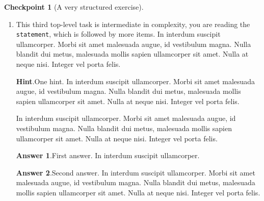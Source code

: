 \documentclass{amsart}
\theoremstyle{plain}%
\theoremstyle{definition}%
\newtheorem{inlineexercise}[theorem]{Checkpoint}
\theoremstyle{remark}%
\newcommand{\blocktitlefont}{\relax}
\newcommand{\mono}[1]{\texttt{#1}}
\numberwithin{equation}{section}
\begin{document}
\begin{inlineexercise}[A very structured exercise]
\begin{enumerate}[font=\bfseries,label=(\alph*),ref=\alph*]
\begin{enumerate}[font=\bfseries,label=(\roman*),ref=\theenumi.\roman*]
\begin{enumerate}[font=\bfseries,label=(\Alph*),ref=\theenumi.\theenumii.\Alph*]
\par
In interdum suscipit ullamcorper%
\par
In interdum suscipit ullamcorper. Morbi sit amet malesuada augue, id vestibulum magna. Nulla blandit dui metus, malesuada mollis sapien ullamcorper sit amet. Nulla at neque nisi. Integer vel porta felis.%
\end{enumerate}%
The conclusion of the structured subtask.  In interdum suscipit ullamcorper. Morbi sit amet malesuada augue, id vestibulum magna. Nulla blandit dui metus, malesuada mollis sapien ullamcorper sit amet. Nulla at neque nisi. Integer vel porta felis.%
\item{}A simple task as the last subtask.  In interdum suscipit ullamcorper. Morbi sit amet malesuada augue, id vestibulum magna. Nulla blandit dui metus, malesuada mollis sapien ullamcorper sit amet. Nulla at neque nisi. Integer vel porta felis.%
\end{enumerate}%
This concludes our structured second task.  In interdum suscipit ullamcorper. Morbi sit amet malesuada augue, id vestibulum magna. Nulla blandit dui metus, malesuada mollis sapien ullamcorper sit amet. Nulla at neque nisi. Integer vel porta felis.%
\item{}This third top-level task is intermediate in complexity, you are reading the \mono{statement}, which is followed by more items. In interdum suscipit ullamcorper. Morbi sit amet malesuada augue, id vestibulum magna. Nulla blandit dui metus, malesuada mollis sapien ullamcorper sit amet. Nulla at neque nisi. Integer vel porta felis.%
\par\smallskip%
\noindent\textbf{\blocktitlefont Hint}.\hypertarget{exercise-structured-6-2}{}\quad{}One hint.  In interdum suscipit ullamcorper. Morbi sit amet malesuada augue, id vestibulum magna. Nulla blandit dui metus, malesuada mollis sapien ullamcorper sit amet. Nulla at neque nisi. Integer vel porta felis.%
\par
In interdum suscipit ullamcorper. Morbi sit amet malesuada augue, id vestibulum magna. Nulla blandit dui metus, malesuada mollis sapien ullamcorper sit amet. Nulla at neque nisi. Integer vel porta felis.%
\par\smallskip%
\noindent\textbf{\blocktitlefont Answer 1}.\hypertarget{exercise-structured-6-3}{}\quad{}First answer.  In interdum suscipit ullamcorper.%
\par\smallskip%
\noindent\textbf{\blocktitlefont Answer 2}.\hypertarget{exercise-structured-6-4}{}\quad{}Second answer.  In interdum suscipit ullamcorper. Morbi sit amet malesuada augue, id vestibulum magna. Nulla blandit dui metus, malesuada mollis sapien ullamcorper sit amet. Nulla at neque nisi. Integer vel porta felis.%

\end{enumerate}
\end{inlineexercise}
\end{document}
